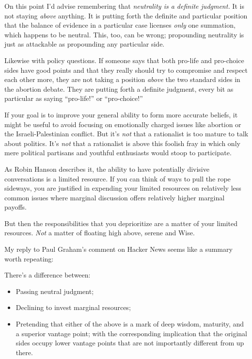 {
 On this point I'd advise remembering that
\textit{neutrality is a definite judgment.} It is not staying
\textit{above} anything. It is putting forth the definite and
particular position that the balance of evidence in a particular case
licenses \textit{only} one summation, which happens to be neutral.
This, too, can be wrong; propounding neutrality is just as attackable
as propounding any particular side.}

{
 Likewise with policy questions. If someone says that both pro-life
and pro-choice sides have good points and that they really should try
to compromise and respect each other more, they are not taking a
position \textit{above} the two standard sides in the abortion debate.
They are putting forth a definite judgment, every bit as particular as
saying ``pro-life!'' or
``pro-choice!''}

{
 If your goal is to improve your general ability to form more
accurate beliefs, it might be useful to avoid focusing on emotionally
charged issues like abortion or the Israeli-Palestinian conflict. But
it's \textit{not} that a rationalist is too mature to
talk about politics. It's \textit{not} that a
rationalist is above this foolish fray in which only mere political
partisans and youthful enthusiasts would stoop to participate.}

{
 As Robin Hanson describes it, the ability to have potentially
divisive conversations is a limited resource. If you can think of ways
to pull the rope sideways, you are justified in expending your limited
resources on relatively less common issues where marginal discussion
offers relatively higher marginal payoffs.}

{
 But then the responsibilities that you deprioritize are a matter
of your limited resources. \textit{Not} a matter of floating high
above, serene and Wise.}

{
 My reply to Paul Graham's comment on Hacker News
seems like a summary worth repeating:}

{
 There's a difference between:}

\begin{itemize}
\item {
 Passing neutral judgment;}

\item {
 Declining to invest marginal resources;}

\item {
 Pretending that either of the above is a mark of deep wisdom,
maturity, and a superior vantage point; with the corresponding
implication that the original sides occupy lower vantage points that
are not importantly different from up there.}
\end{itemize}

